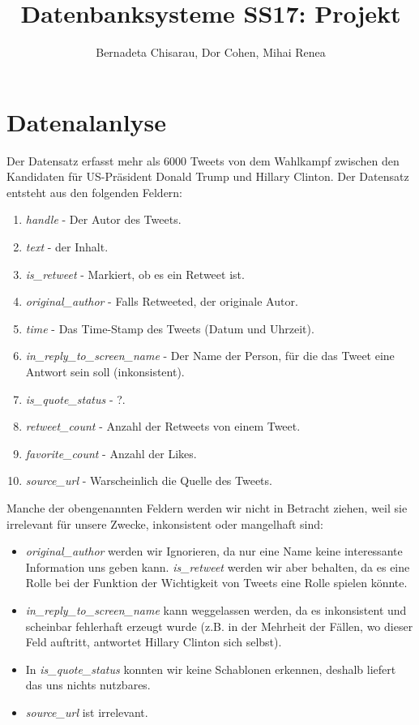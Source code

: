 \documentclass[paper=a4, english, ngerman, romanian]{scrartcl}
\title{Datenbanksysteme SS17: Projekt}
\author{Bernadeta Chisarau, Dor Cohen, Mihai Renea}
\begin{document}
	\maketitle
	
	\pagebreak
	
	\section{Datenalanlyse}
		Der Datensatz erfasst mehr als 6000 Tweets von dem Wahlkampf zwischen den Kandidaten für US-Präsident Donald Trump und Hillary Clinton. Der Datensatz entsteht aus den folgenden Feldern:
		\begin{enumerate}
		\item \textit{handle} - Der Autor des Tweets.
		\item \textit{text} - der Inhalt.
		\item \textit{is\_retweet} - Markiert, ob es ein Retweet ist.
		\item \textit{original\_author} - Falls Retweeted, der originale Autor.
		\item \textit{time} - Das Time-Stamp des Tweets (Datum und Uhrzeit).
		\item \textit{in\_reply\_to\_screen\_name} - Der Name der Person, für die das Tweet eine Antwort sein soll (inkonsistent).
		\item \textit{is\_quote\_status} - ?.
		\item \textit{retweet\_count} - Anzahl der Retweets von einem Tweet.
		\item \textit{favorite\_count} - Anzahl der Likes.
		\item \textit{source\_url} - Warscheinlich die Quelle des Tweets.
		\end{enumerate}
		
		Manche der obengenannten Feldern werden wir nicht in Betracht ziehen, weil sie irrelevant für unsere Zwecke, inkonsistent oder mangelhaft sind:
		
		\begin{itemize}
		\item \textit{original\_author} werden wir Ignorieren, da nur eine Name keine interessante Information uns geben kann. \textit{is\_retweet} werden wir aber behalten, da es eine Rolle bei der Funktion der Wichtigkeit von Tweets eine Rolle spielen könnte.
		\item \textit{in\_reply\_to\_screen\_name} kann weggelassen werden, da es inkonsistent und scheinbar fehlerhaft erzeugt wurde (z.B. in der Mehrheit der Fällen, wo dieser Feld auftritt, antwortet Hillary Clinton sich selbst).
		\item  In \textit{is\_quote\_status} konnten wir keine Schablonen erkennen, deshalb liefert das uns nichts nutzbares.
		\item \textit{source\_url} ist irrelevant.
		\end{itemize}
		
\end{document}
